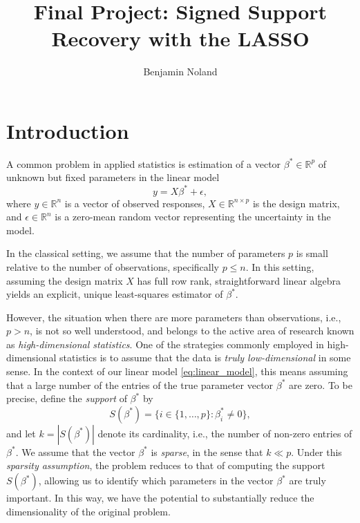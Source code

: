\documentclass[letterpaper,12pt]{article}
\title{Final Project: Signed Support Recovery with the LASSO}
\author{Benjamin Noland}
\date{}
\begin{document}
\maketitle

\section*{Introduction}

A common problem in applied statistics is estimation of a vector
$\beta^\ast \in \mathbb{R}^p$ of unknown but fixed parameters in the
linear model
\begin{equation} \label{eq:linear_model}
  y = X\beta^\ast + \epsilon,
\end{equation}
where $y \in \mathbb{R}^n$ is a vector of observed responses,
$X \in \mathbb{R}^{n \times p}$ is the design matrix, and
$\epsilon \in \mathbb{R}^n$ is a zero-mean random vector representing
the uncertainty in the model.

In the classical setting, we assume that the number of parameters $p$
is small relative to the number of observations, specifically
$p \leq n$. In this setting, assuming the design matrix $X$ has full
row rank, straightforward linear algebra yields an explicit, unique
least-squares estimator of $\beta^\ast$.

However, the situation when there are more parameters than
observations, i.e., $p > n$, is not so well understood, and belongs to
the active area of research known as \textit{high-dimensional
  statistics}. One of the strategies commonly employed in
high-dimensional statistics is to assume that the data is \emph{truly
  low-dimensional} in some sense. In the context of our linear model
\eqref{eq:linear_model}, this means assuming that a large number of
the entries of the true parameter vector $\beta^\ast$ are zero. To be
precise, define the \textit{support} of $\beta^\ast$ by
\begin{equation*}
  S(\beta^\ast) = \{i \in \{1, \ldots, p\} : \beta^\ast_i \neq 0\},
\end{equation*}
and let $k = |S(\beta^\ast)|$ denote its cardinality, i.e., the number
of non-zero entries of $\beta^\ast$. We assume that the vector
$\beta^\ast$ is \textit{sparse}, in the sense that $k \ll p$. Under
this \textit{sparsity assumption}, the problem reduces to that of
computing the support $S(\beta^\ast)$, allowing us to identify which
parameters in the vector $\beta^\ast$ are truly important. In this
way, we have the potential to substantially reduce the dimensionality
of the original problem.
\end{document}
